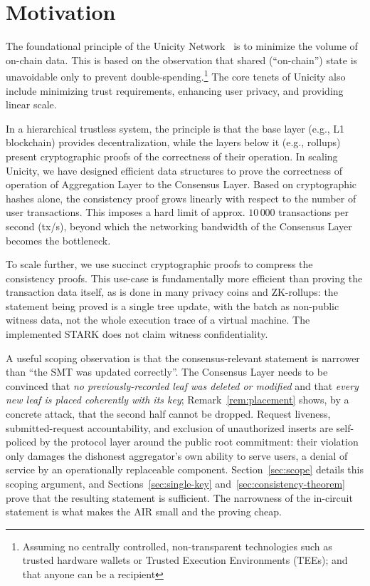 \documentclass[11pt]{article}
\begin{document}
\section{Motivation}

The foundational principle of the Unicity Network~\cite{wp} is to minimize the volume of on-chain data. This is based on the observation that shared (``on-chain'') state is unavoidable only to prevent double-spending.\footnote{Assuming no centrally controlled, non-transparent technologies such as trusted hardware wallets or Trusted Execution Environments (TEEs); and that anyone can be a recipient} The core tenets of Unicity also include minimizing trust requirements, enhancing user privacy, and providing linear scale.

In a hierarchical trustless system, the principle is that the base layer (e.g., L1 blockchain) provides decentralization, while the layers below it (e.g., rollups) present cryptographic proofs of the correctness of their operation. In scaling Unicity, we have designed efficient data structures to prove the correctness of operation of Aggregation Layer to the Consensus Layer. Based on cryptographic hashes alone, the consistency proof grows linearly with respect to the number of user transactions. This imposes a hard limit of approx. $10\,000$ transactions per second (tx/s), beyond which the networking bandwidth of the Consensus Layer becomes the bottleneck.

To scale further, we use succinct cryptographic proofs to compress the consistency proofs. This use-case is fundamentally more efficient than proving the transaction data itself, as is done in many privacy coins and ZK-rollups: the statement being proved is a single tree update, with the batch as non-public witness data, not the whole execution trace of a virtual machine. The implemented STARK does not claim witness confidentiality.

A useful scoping observation is that the consensus-relevant statement is narrower than ``the SMT was updated correctly''. The Consensus Layer needs to be convinced that \emph{no previously-recorded leaf was deleted or modified} and that \emph{every new leaf is placed coherently with its key}; Remark~\ref{rem:placement} shows, by a concrete attack, that the second half cannot be dropped. Request liveness, submitted-request accountability, and exclusion of unauthorized inserts are self-policed by the protocol layer around the public root commitment: their violation only damages the dishonest aggregator's own ability to serve users, a denial of service by an operationally replaceable component. Section~\ref{sec:scope} details this scoping argument, and Sections~\ref{sec:single-key} and~\ref{sec:consistency-theorem} prove that the resulting statement is sufficient. The narrowness of the in-circuit statement is what makes the AIR small and the proving cheap.
\end{document}
